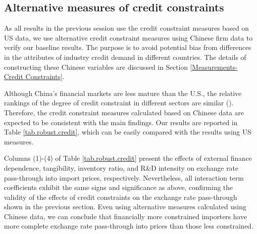 \subsection{Alternative measures of credit constraints}

As all results in the previous session use the credit constraint measures based on US data, we use alternative credit constraint measures using Chinese firm data to verify our baseline results. The purpose is to avoid potential bias from differences in the attributes of industry credit demand in different countries. The details of constructing these Chinese variables are discussed in Section \ref{Measurements-Credit Constraints}. 

Although China's financial markets are less mature than the U.S., the relative rankings of the degree of credit constraint in different sectors are similar (\cite{manova2013}). Therefore, the credit constraint measures calculated based on Chinese data are expected to be consistent with the main findings. Our results are reported in Table \ref{tab.robust.credit}, which can be easily compared with the results using US measures.

Columns (1)-(4) of Table \ref{tab.robust.credit} present the effects of external finance dependence, tangibility, inventory ratio, and R\&D intensity on exchange rate pass-through into import prices, respectively. Nevertheless, all interaction term coefficients exhibit the same signs and significance as above, confirming the validity of the effects of credit constraints on the exchange rate pass-through shown in the previous section. Even using alternative measures calculated using Chinese data, we can conclude that financially more constrained importers have more complete exchange rate pass-through into prices than those less constrained.

